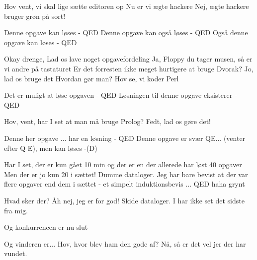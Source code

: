 \documentclass[a4paper,11pt]{article}
\begin{document}
\begin{sketch}

   Hov vent, vi skal lige sætte editoren op
   Nu er vi ægte hackere
   Nej, ægte hackere bruger grøn på sort!

   Denne opgave kan løses - QED
   Denne opgave kan også løses - QED
   Også denne opgave kan løses - QED

   Okay drenge, Lad os lave noget opgavefordeling
   Ja, Floppy du tager musen, så er vi andre på tastaturet
   Er det forresten ikke meget hurtigere at bruge Dvorak?
   Jo, lad os bruge det
   Hvordan gør man?
   Hov se, vi koder Perl

   Det er muligt at løse opgaven - QED
   Løsningen til denne opgave eksisterer - QED

   Hov, vent, har I set at man må bruge Prolog?
   Fedt, lad os gøre det!

   Denne her opgave ... har en løsning - QED
   Denne opgave er svær QE... (venter efter Q E), men kan løses -(D)

   Har I set, der er kun gået 10 min og der er en der allerede har løst 40 opgaver
   Men der er jo kun 20 i sættet!
   Dumme dataloger. Jeg har bare bevist at der var flere opgaver end dem i sættet - et simpelt induktionsbevis ... QED haha grynt 

   Hvad sker der? Åh nej, jeg er for god!
   Skide dataloger. I har ikke set det sidste fra mig.

   Og konkurrencen er nu slut

   Og vinderen er...
   Hov, hvor blev ham den gode af? Nå, så er det vel jer der har vundet.


\end{sketch}
\end{document}
